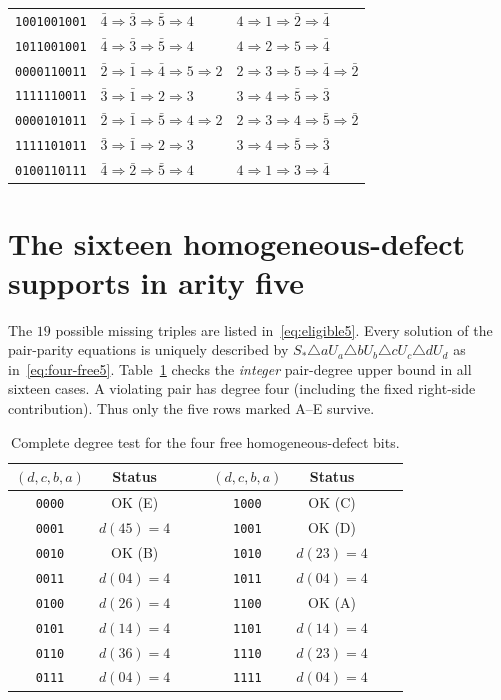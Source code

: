 \documentclass[11pt,a4paper]{article}
\theoremstyle{remark}
\begin{document}
{\begin{longtable}{@{}cll@{}}
\texttt{1001001001}&$\bar{4}\Rightarrow\bar{3}\Rightarrow\bar{5}\Rightarrow4$&$4\Rightarrow1\Rightarrow\bar{2}\Rightarrow\bar{4}$\\
\texttt{1011001001}&$\bar{4}\Rightarrow\bar{3}\Rightarrow\bar{5}\Rightarrow4$&$4\Rightarrow2\Rightarrow5\Rightarrow\bar{4}$\\
\texttt{0000110011}&$\bar{2}\Rightarrow\bar{1}\Rightarrow\bar{4}\Rightarrow5\Rightarrow2$&$2\Rightarrow3\Rightarrow5\Rightarrow\bar{4}\Rightarrow\bar{2}$\\
\texttt{1111110011}&$\bar{3}\Rightarrow\bar{1}\Rightarrow2\Rightarrow3$&$3\Rightarrow4\Rightarrow\bar{5}\Rightarrow\bar{3}$\\
\texttt{0000101011}&$\bar{2}\Rightarrow\bar{1}\Rightarrow\bar{5}\Rightarrow4\Rightarrow2$&$2\Rightarrow3\Rightarrow4\Rightarrow\bar{5}\Rightarrow\bar{2}$\\
\texttt{1111101011}&$\bar{3}\Rightarrow\bar{1}\Rightarrow2\Rightarrow3$&$3\Rightarrow4\Rightarrow\bar{5}\Rightarrow\bar{3}$\\
\texttt{0100110111}&$\bar{4}\Rightarrow\bar{2}\Rightarrow\bar{5}\Rightarrow4$&$4\Rightarrow1\Rightarrow3\Rightarrow\bar{4}$\\
\bottomrule
\end{longtable}
}

\clearpage
\section{The sixteen homogeneous-defect supports in arity five}
\label{app:five-tables}
The $19$ possible missing triples are listed in~\eqref{eq:eligible5}.
Every solution of the pair-parity equations is uniquely described by
$S_*\triangle aU_a\triangle bU_b\triangle cU_c\triangle dU_d$
as in~\eqref{eq:four-free5}.  Table~\ref{tab:n5supports}
checks the \emph{integer} pair-degree upper bound in all sixteen
cases.  A violating pair has degree four (including the fixed
right-side contribution).  Thus only the five rows marked A--E survive.

\begin{table}[htbp]\centering\small
\begin{tabular}{@{}cccc|cccc@{}}\toprule
$(d,c,b,a)$&Status&&&$(d,c,b,a)$&Status&&\\\midrule
\texttt{0000}&OK (E)&&&\texttt{1000}&OK (C)&&\\
\texttt{0001}&$d(45)=4$&&&\texttt{1001}&OK (D)&&\\
\texttt{0010}&OK (B)&&&\texttt{1010}&$d(23)=4$&&\\
\texttt{0011}&$d(04)=4$&&&\texttt{1011}&$d(04)=4$&&\\
\texttt{0100}&$d(26)=4$&&&\texttt{1100}&OK (A)&&\\
\texttt{0101}&$d(14)=4$&&&\texttt{1101}&$d(14)=4$&&\\
\texttt{0110}&$d(36)=4$&&&\texttt{1110}&$d(23)=4$&&\\
\texttt{0111}&$d(04)=4$&&&\texttt{1111}&$d(04)=4$&&\\
\bottomrule
\end{tabular}
\caption{Complete degree test for the four free homogeneous-defect bits.}\label{tab:n5supports}
\end{table}
\end{document}

